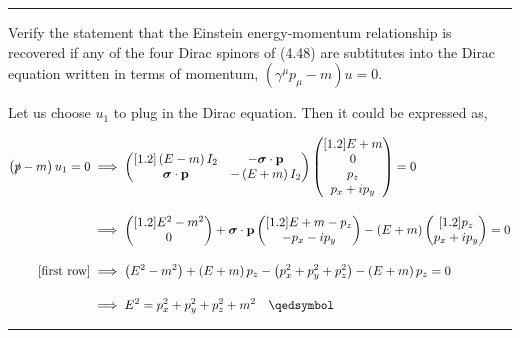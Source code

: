 \noindent\rule{7in}{1.5pt}


\begin{problem}{4.3}
Verify the statement that the Einstein energy-momentum relationship is recovered if any of the four Dirac spinors of (4.48)
are subtitutes into the Dirac equation written in terms of momentum, $\left( \gamma^\mu p_\mu-m \right)u=0$.
\end{problem}
\begin{solution}
Let us choose $u_1$ to plug in the Dirac equation. Then it could be expressed as,

\begin{align*}
    \left(\slashed{p}-m\right)u_1 = 0 &\implies \begin{pmatrix}[1.2]
        \left(E-m\right)I_2 & -\sigp \\
        \sigp & -\left(E+m\right) I_2 
    \end{pmatrix}
    \begin{pmatrix}[1.2]
        E+m \\
        0 \\
        p_z \\
        p_x + ip_y 
    \end{pmatrix} = 0  \\[0.15in]
    &\implies \begin{pmatrix}[1.2]
        E^2-m^2 \\
        0
    \end{pmatrix} + \sigp\begin{pmatrix}[1.2]
        E+m-p_z \\
        -p_x -ip_y
    \end{pmatrix} - \left(E+m\right)\begin{pmatrix}[1.2]
        p_z \\
        p_x+ip_y
    \end{pmatrix} = 0 \\[0.15in]
    \text{[first row]} &\implies \left(E^2-m^2\right) + \left(E+m\right)p_z - \left(p_x^2+p_y^2+p_z^2\right) - \left(E+m\right) p_z = 0 \\[0.15in] 
    &\implies E^2 = p_x^2 +p_y^2 + p_z^2 +m^2  \qed
\end{align*}
\end{solution}

\noindent\rule{7in}{1.5pt}


